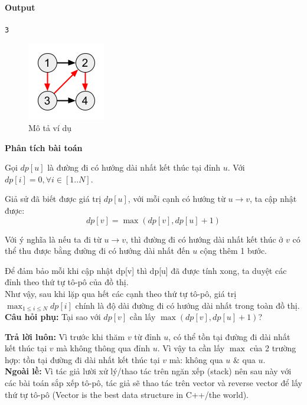 \documentclass{article}
\begin{document}
\paragraph{Output}
\begin{lstlisting}
3
\end{lstlisting}

\begin{figure}[h]
    \centering
    \includegraphics[width=0.1 \textwidth]{img/b2/longest_0_muffet.png}
    \caption{Mô tả ví dụ}    
\end{figure}

\textbf{Phân tích bài toán}

Gọi $dp[u]$ là đường đi có hướng dài nhất kết thúc tại đỉnh $u$. Với $dp[i] = 0, \forall i \in [1..N]$. 

Giả sử đã biết được giá trị $dp[u]$, với mỗi cạnh có hướng từ $u \rightarrow v$, ta cập nhật được:
\[
    dp[v] = \max(dp[v], dp[u] + 1)
\]

Với ý nghĩa là nếu ta đi từ $u \rightarrow v$, thì đường đi có hướng dài nhất kết thúc ở $v$ có thể thu được bằng đường đi có hướng dài nhất đến $u$ cộng thêm 1 bước.

Để đảm bảo mỗi khi cập nhật dp[v] thì dp[u] đã được tính xong, ta duyệt các đỉnh theo thứ tự tô-pô của đồ thị.\\

Như vậy, sau khi lặp qua hết các cạnh theo thứ tự tô-pô, giá trị $\max_{1 \leq i \leq N} dp[i]$ chính là độ dài đường đi có hướng dài nhất trong toàn đồ thị.\\

\textbf{Câu hỏi phụ:} Tại sao với $dp[v]$ cần lấy $\max(dp[v], dp[u] + 1)$?

\textbf{Trả lời luôn:} Vì trước khi thăm $v$ từ đỉnh $u$, có thể tồn tại đường đi dài nhất kết thúc tại $v$ mà không thông qua đỉnh $u$. Vì vậy ta cần lấy $\max$ của 2 trường hợp: tồn tại đường đi dài nhất kết thúc tại $v$ mà: không qua $u$ $\&$ qua $u$.\\

\textbf{Ngoài lề:} Vì tác giả lười xử lý/thao tác trên ngăn xếp (stack) nên sau này với các bài toán sắp xếp tô-pô, tác giả sẽ thao tác trên vector và reverse vector để lấy thứ tự tô-pô (Vector is the best data structure in C++/the world).
\end{document}
